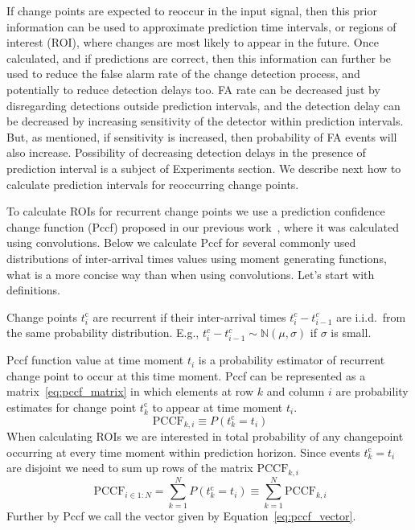 If change points are expected to reoccur in the input signal, then this prior information can be used to approximate prediction time intervals, or regions of interest (ROI), where changes are most likely to appear in the future.
Once calculated, and if predictions are correct, then this information can further be used to reduce the false alarm rate of the change detection process, and potentially to reduce detection delays too.
FA rate can be decreased just by disregarding detections outside prediction intervals, and the detection delay can be decreased by increasing sensitivity of the detector within prediction intervals.
But, as mentioned, if sensitivity is increased, then probability of FA events will also increase.
Possibility of decreasing detection delays in the presence of prediction interval is a subject of Experiments section.
We describe next how to calculate prediction intervals for reoccurring change points.

To calculate ROIs for recurrent change points we use a prediction confidence change function (Pccf) proposed in our previous work~\cite{MaslovSDM2016}, where it was calculated using convolutions.
Below we calculate Pccf for several commonly used distributions of inter-arrival times values using moment generating functions, what is a more concise way than when using convolutions.
Let's start with definitions.
\begin{definition}
	Change points $t_i^{\text{c}}$ are recurrent if their inter-arrival times $t_{i}^{c} - t_{i-1}^{c}$
	are i.i.d.\ from the same probability distribution.
	E.g., $t_{i}^{c} - t_{i-1}^{c} \sim \mathbb{N}(\mu, \sigma)$ if $\sigma$ is small.
\end{definition}
Pccf function value at time moment $t_i$ is a probability estimator of recurrent change point to occur at this time moment.
Pccf can be represented as a matrix~\ref{eq:pccf_matrix} in which elements at row $k$ and column $i$ are probability estimates for change point $t_k^{\text{c}}$ to appear at time moment $t_i$.
\begin{equation}~\label{eq:pccf_matrix}
	\text{PCCF}_{k,i} \equiv P(t_{k}^{\text{c}} = t_i) %
\end{equation}
When calculating ROIs we are interested in total probability of any changepoint occurring at every time moment within prediction horizon.
Since events $t_k^{\text{c}} = t_i$ are disjoint we need to sum up rows of the matrix $\text{PCCF}_{k,i}$
\begin{equation}~\label{eq:pccf_vector}
	\text{PCCF}_{i \in 1:N} = \sum_{k=1}^{N} P(t_k^{\text{c}} = t_i) \equiv \sum_{k=1}^{N} \text{PCCF}_{k,i}
\end{equation}
Further by Pccf we call the vector given by Equation~\ref{eq:pccf_vector}.

